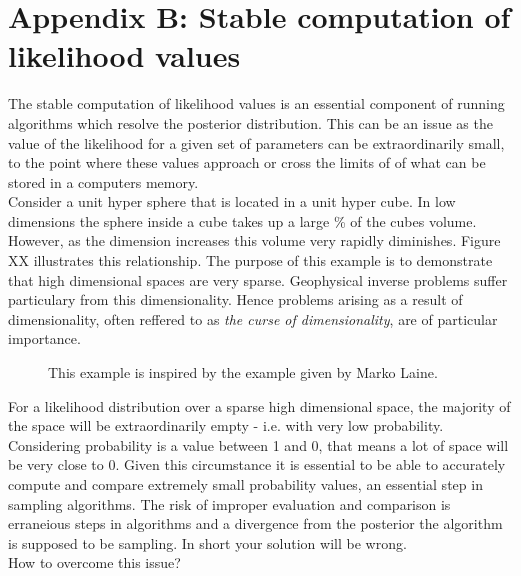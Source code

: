 \chapter{Appendix B: Stable computation of likelihood values}
\label{AppendixB}

The stable computation of likelihood values is an essential component of running algorithms which resolve the posterior distribution. This can be an issue as the value of the likelihood for a given set of parameters can be extraordinarily small, to the point where these values approach or cross the limits of of what can be stored in a computers memory. \\

Consider a unit hyper sphere that is located in a unit hyper cube. In low dimensions the sphere inside a cube takes up a large \% of the cubes volume. However, as the dimension increases this volume very rapidly diminishes. Figure XX illustrates this relationship. The purpose of this example is to demonstrate that high dimensional spaces are very sparse. Geophysical inverse problems suffer particulary from this dimensionality. Hence problems arising as a result of dimensionality, often reffered to as \textit{the curse of dimensionality}, are of particular importance. \\

\begin{figure}
	\centering
	\caption{This example is inspired by the example given by Marko Laine.}
\end{figure}

For a likelihood distribution over a sparse high dimensional space, the majority of the space will be extraordinarily empty - i.e. with very low probability. Considering probability is a value between 1 and 0, that means a lot of space will be very close to 0. Given this circumstance it is essential to be able to accurately compute and compare extremely small probability values, an essential step in sampling algorithms. The risk of improper evaluation and comparison is erraneious steps in algorithms and a divergence from the posterior the algorithm is supposed to be sampling. In short your solution will be wrong. \\

How to overcome this issue?

